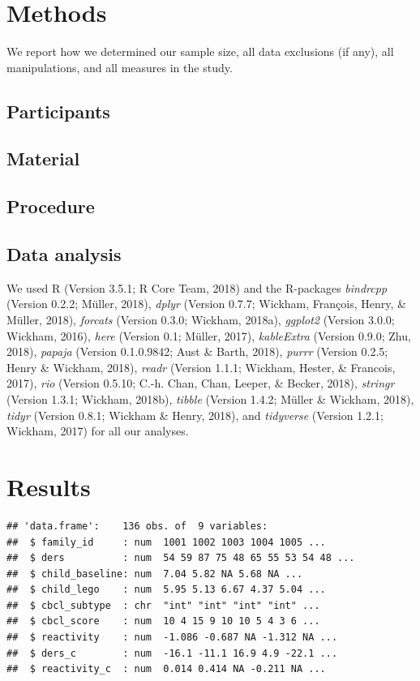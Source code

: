 \documentclass[man]{apa6}
\begin{document}
\section{Methods}\label{methods}

We report how we determined our sample size, all data exclusions (if
any), all manipulations, and all measures in the study.

\subsection{Participants}\label{participants}

\subsection{Material}\label{material}

\subsection{Procedure}\label{procedure}

\subsection{Data analysis}\label{data-analysis}

We used R (Version 3.5.1; R Core Team, 2018) and the R-packages
\emph{bindrcpp} (Version 0.2.2; Müller, 2018), \emph{dplyr} (Version
0.7.7; Wickham, François, Henry, \& Müller, 2018), \emph{forcats}
(Version 0.3.0; Wickham, 2018a), \emph{ggplot2} (Version 3.0.0; Wickham,
2016), \emph{here} (Version 0.1; Müller, 2017), \emph{kableExtra}
(Version 0.9.0; Zhu, 2018), \emph{papaja} (Version 0.1.0.9842; Aust \&
Barth, 2018), \emph{purrr} (Version 0.2.5; Henry \& Wickham, 2018),
\emph{readr} (Version 1.1.1; Wickham, Hester, \& Francois, 2017),
\emph{rio} (Version 0.5.10; C.-h. Chan, Chan, Leeper, \& Becker, 2018),
\emph{stringr} (Version 1.3.1; Wickham, 2018b), \emph{tibble} (Version
1.4.2; Müller \& Wickham, 2018), \emph{tidyr} (Version 0.8.1; Wickham \&
Henry, 2018), and \emph{tidyverse} (Version 1.2.1; Wickham, 2017) for
all our analyses.

\section{Results}\label{results}

\begin{verbatim}
## 'data.frame':    136 obs. of  9 variables:
##  $ family_id     : num  1001 1002 1003 1004 1005 ...
##  $ ders          : num  54 59 87 75 48 65 55 53 54 48 ...
##  $ child_baseline: num  7.04 5.82 NA 5.68 NA ...
##  $ child_lego    : num  5.95 5.13 6.67 4.37 5.04 ...
##  $ cbcl_subtype  : chr  "int" "int" "int" "int" ...
##  $ cbcl_score    : num  10 4 15 9 10 10 5 4 3 6 ...
##  $ reactivity    : num  -1.086 -0.687 NA -1.312 NA ...
##  $ ders_c        : num  -16.1 -11.1 16.9 4.9 -22.1 ...
##  $ reactivity_c  : num  0.014 0.414 NA -0.211 NA ...
\end{verbatim}
\end{document}
